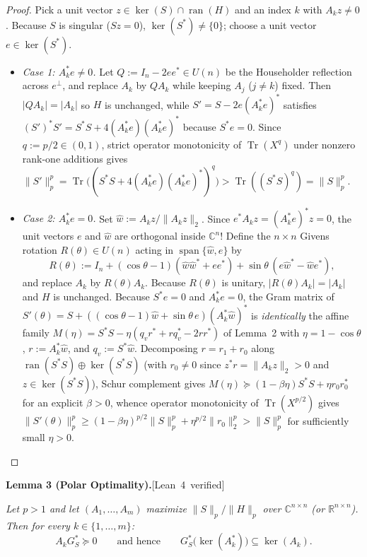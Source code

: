\documentclass[10pt,letterpaper]{article}
\newcommand{\leanbadge}[1]{\mbox{\sffamily\scriptsize\color{leanborder}[#1]}}
\newcommand{\C}{\mathbb{C}}
\newcommand{\R}{\mathbb{R}}
\newcommand{\Tr}{\operatorname{Tr}}
\newcommand{\ran}{\operatorname{ran}}
\begin{document}
\begin{proof}
Pick a unit vector $z \in \ker(S) \cap \ran(H)$ and an index $k$ with $A_k z \neq 0$. Because $S$ is singular ($Sz = 0$), $\ker(S^*) \neq \{0\}$; choose a unit vector $e \in \ker(S^*)$.
\begin{itemize}[leftmargin=1.4em,itemsep=2pt]
  \item \emph{Case 1: $A_k^* e \neq 0$.} Let $Q := I_n - 2 e e^* \in U(n)$ be the Householder reflection across $e^\perp$, and replace $A_k$ by $Q A_k$ while keeping $A_j$ ($j \neq k$) fixed. Then $|Q A_k| = |A_k|$ so $H$ is unchanged, while $S' = S - 2 e (A_k^* e)^*$ satisfies $(S')^* S' = S^* S + 4 (A_k^* e)(A_k^* e)^*$ because $S^* e = 0$. Since $q := p/2 \in (0, 1)$, strict operator monotonicity of $\Tr(X^q)$ under nonzero rank-one additions gives $\|S'\|_p^p = \Tr\bigl((S^* S + 4(A_k^* e)(A_k^* e)^*)^q\bigr) > \Tr((S^* S)^q) = \|S\|_p^p$.
  \item \emph{Case 2: $A_k^* e = 0$.} Set $\hat{w} := A_k z / \|A_k z\|_2$. Since $e^* A_k z = (A_k^* e)^* z = 0$, the unit vectors $e$ and $\hat{w}$ are orthogonal inside $\C^n$! Define the $n\times n$ Givens rotation $R(\theta) \in U(n)$ acting in $\operatorname{span}\{\hat{w}, e\}$ by
  \[
    R(\theta) := I_n + (\cos\theta - 1)(\hat{w}\hat{w}^* + e e^*) + \sin\theta\,(e\hat{w}^* - \hat{w}e^*),
  \]
  and replace $A_k$ by $R(\theta) A_k$. Because $R(\theta)$ is unitary, $|R(\theta) A_k| = |A_k|$ and $H$ is unchanged. Because $S^* e = 0$ and $A_k^* e = 0$, the Gram matrix of $S'(\theta) = S + ((\cos\theta - 1)\hat{w} + \sin\theta\,e)(A_k^* \hat{w})^*$ is \emph{identically} the affine family $M(\eta) = S^* S - \eta(q_v r^* + r q_v^* - 2 r r^*)$ of Lemma~2 with $\eta = 1 - \cos\theta$, $r := A_k^* \hat{w}$, and $q_v := S^* \hat{w}$. Decomposing $r = r_1 + r_0$ along $\ran(S^* S) \oplus \ker(S^* S)$ (with $r_0 \neq 0$ since $z^* r = \|A_k z\|_2 > 0$ and $z \in \ker(S^* S)$), Schur complement gives $M(\eta) \succeq (1 - \beta\eta) S^* S + \eta r_0 r_0^*$ for an explicit $\beta > 0$, whence operator monotonicity of $\Tr(X^{p/2})$ gives $\|S'(\theta)\|_p^p \ge (1-\beta\eta)^{p/2}\|S\|_p^p + \eta^{p/2}\|r_0\|_2^p > \|S\|_p^p$ for sufficiently small $\eta > 0$. \qedhere
\end{itemize}
\end{proof}

\begin{tcolorbox}[lemmabox]
\textbf{Lemma 3 (Polar Optimality).}\hfill\leanbadge{Lean~4 verified}\par\vspace{1.5pt}
\emph{Let $p > 1$ and let $(A_1,\dots,A_m)$ maximize $\|S\|_p / \|H\|_p$ over $\C^{n\times n}$ (or $\R^{n\times n}$). Then for every $k \in \{1,\dots,m\}$:}
\[
  A_k G_S^* \succeq 0 \qquad \text{and hence} \qquad G_S^*\bigl(\ker(A_k^*)\bigr) \subseteq \ker(A_k).
\]
\end{tcolorbox}
\end{document}

